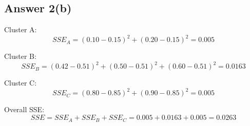 \documentclass{article}
\begin{document}
\subsection{Answer 2(b)}

Cluster A\@: 
\begin{equation*}
    SSE_A = {(0.10 - 0.15)}^2 + {(0.20 - 0.15)}^2 = 0.005
\end{equation*}

Cluster B\@:
\begin{equation*}
    SSE_B = {(0.42 - 0.51)}^2 + {(0.50 - 0.51)}^2 + {(0.60 - 0.51)}^2 = 0.0163
\end{equation*}

Cluster C\@:
\begin{equation*}
    SSE_C = {(0.80 - 0.85)}^2 + {(0.90 - 0.85)}^2 = 0.005
\end{equation*}

Overall SSE\@:
\begin{equation*}
    SSE = SSE_A + SSE_B + SSE_C = 0.005 + 0.0163 + 0.005 = 0.0263
\end{equation*}
\end{document}

